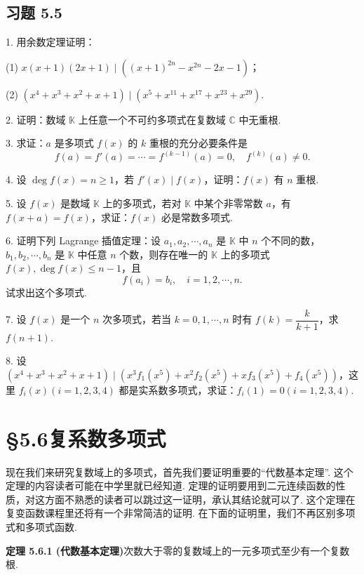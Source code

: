\documentclass[UTF8,12pt,a4paper,fontset=fandol]{ctexart}
\begin{document}
\subsection*{习题 5.5}

1. 用余数定理证明：

(1) $x(x+1)(2x+1)\mid ((x+1)^{2n}-x^{2n}-2x-1)$；

(2) $(x^4+x^3+x^2+x+1)\mid (x^5+x^{11}+x^{17}+x^{23}+x^{29})$.

2. 证明：数域 $\mathbb{K}$ 上任意一个不可约多项式在复数域 $\mathbb{C}$ 中无重根.

3. 求证：$a$ 是多项式 $f(x)$ 的 $k$ 重根的充分必要条件是
\[
f(a)=f'(a)=\cdots=f^{(k-1)}(a)=0,\quad f^{(k)}(a)\neq 0.
\]

4. 设 $\deg f(x)=n\geq 1$，若 $f'(x)\mid f(x)$，证明：$f(x)$ 有 $n$ 重根.

5. 设 $f(x)$ 是数域 $\mathbb{K}$ 上的多项式，若对 $\mathbb{K}$ 中某个非零常数 $a$，有 $f(x+a)=f(x)$，求证：$f(x)$ 必是常数多项式.

6. 证明下列 Lagrange 插值定理：设 $a_1,a_2,\cdots,a_n$ 是 $\mathbb{K}$ 中 $n$ 个不同的数，$b_1,b_2,\cdots,b_n$ 是 $\mathbb{K}$ 中任意 $n$ 个数，则存在唯一的 $\mathbb{K}$ 上的多项式 $f(x),\deg f(x)\leq n-1$，且
\[
f(a_i)=b_i,\quad i=1,2,\cdots,n.
\]
试求出这个多项式.

7. 设 $f(x)$ 是一个 $n$ 次多项式，若当 $k=0,1,\cdots,n$ 时有 $f(k)=\dfrac{k}{k+1}$，求 $f(n+1)$.

8. 设 $(x^4+x^3+x^2+x+1)\mid (x^3f_1(x^5)+x^2f_2(x^5)+xf_3(x^5)+f_4(x^5))$，这里 $f_i(x)(i=1,2,3,4)$ 都是实系数多项式，求证：$f_i(1)=0(i=1,2,3,4)$.

\section*{§5.6\quad 复系数多项式}

现在我们来研究复数域上的多项式，首先我们要证明重要的“代数基本定理”. 这个定理的内容读者可能在中学里就已经知道. 定理的证明要用到二元连续函数的性质，对这方面不熟悉的读者可以跳过这一证明，承认其结论就可以了. 这个定理在复变函数课程里还将有一个非常简洁的证明. 在下面的证明里，我们不再区别多项式和多项式函数.

\noindent\textbf{定理 5.6.1 (代数基本定理)}\quad 次数大于零的复数域上的一元多项式至少有一个复数根.
\end{document}
